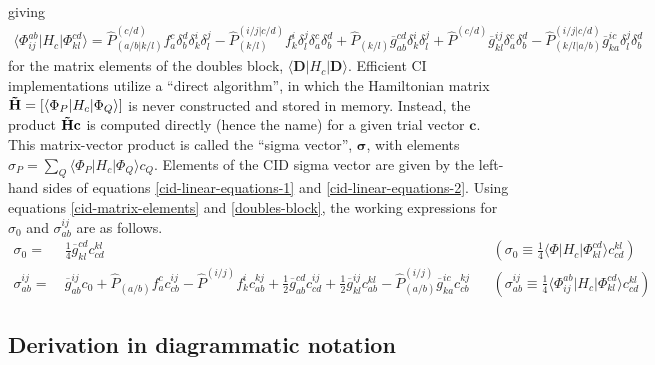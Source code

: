 \documentclass[11pt,fleqn]{article}
\renewcommand{\d}{\delta}    %
\newcommand{\si}{\sigma}     %
\newcommand{\F}{\Phi}        %
\newcommand{\tl}{\ensuremath{\tilde}}
\newcommand{\ol}[1]{\ensuremath{\overline{#1}}}
\newcommand{\op}[1]{\ensuremath{\hat{#1}}}
\newcommand{\bo}[1]{\ensuremath{\mathbf{#1}}}
\newcommand{\pr}[1]{\ensuremath{\left(#1\right)}}
\newcommand{\ip}[1]{\ensuremath{\langle#1\rangle}}
\theoremstyle{mystyle}
\begin{document}
giving
\begin{align}
\label{doubles-block}
  \ip{\F_{ij}^{ab}|H_c|\F_{kl}^{cd}}
=
  \op{P}^{(c/d)}_{(a/b|k/l)}
  f_a^c\d_b^d\d_k^i\d_l^j
-
  \op{P}^{(i/j|c/d)}_{(k/l)}
  f_k^i\d_l^j\d_a^c\d_b^d
+
  \op{P}_{(k/l)}
  \ol{g}_{ab}^{cd}\d_k^i\d_l^j
+
  \op{P}^{(c/d)}
  \ol{g}_{kl}^{ij}\d_a^c\d_b^d
-
  \op{P}^{(i/j|c/d)}_{(k/l|a/b)}
  \ol{g}_{ka}^{ic}\d_l^j\d_b^d
\end{align}
for the matrix elements of the doubles block, $\ip{\bo{D}|H_c|\bo{D}}$.
Efficient CI implementations utilize a ``direct algorithm'', in which the Hamiltonian matrix $\bo{\tl{H}}=[\ip{\F_P|H_c|\F_Q}]$ is never constructed and stored in memory.
Instead, the product $\bo{\tl{H}}\bo{c}$ is computed directly (hence the name) for a given trial vector $\bo{c}$.
This matrix-vector product is called the ``sigma vector'', $\bm\si$, with elements $\si_P=\sum_Q\ip{\F_P|H_c|\F_Q}c_Q$.
Elements of the CID sigma vector are given by the left-hand sides of equations \ref{cid-linear-equations-1} and \ref{cid-linear-equations-2}.
Using equations \ref{cid-matrix-elements} and \ref{doubles-block}, the working expressions for $\si_0$ and $\si_{ab}^{ij}$ are as follows.
\begin{align}
  \si_0
=&\
  \tfrac{1}{4}
  \ol{g}_{kl}^{cd}c_{cd}^{kl}
&&
  \pr{\si_0\equiv\tfrac{1}{4}\ip{\F|H_c|\F_{kl}^{cd}}c_{cd}^{kl}}
\\
  \si_{ab}^{ij}
=&\
  \ol{g}_{ab}^{ij}c_0
+
  \op{P}_{(a/b)}
  f_a^c c_{cb}^{ij}
-
  \op{P}^{(i/j)}
  f_k^ic_{ab}^{kj}
+
  \tfrac{1}{2}
  \ol{g}_{ab}^{cd}c_{cd}^{ij}
+
  \tfrac{1}{2}
  \ol{g}_{kl}^{ij}
  c_{ab}^{kl}
-
  \op{P}^{(i/j)}_{(a/b)}
  \ol{g}_{ka}^{ic}c_{cb}^{kj}
&&
  \pr{\si_{ab}^{ij}\equiv\tfrac{1}{4}\ip{\F_{ij}^{ab}|H_c|\F_{kl}^{cd}}c_{cd}^{kl}}
\end{align}


\subsection*{Derivation in diagrammatic notation}
\end{document}

